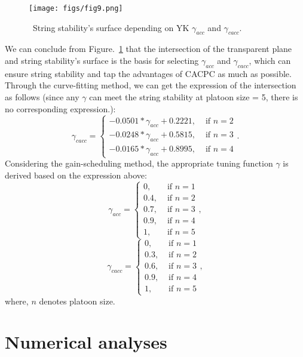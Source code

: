 \documentclass[a4paper,fleqn]{cas-sc}
\begin{document}
\begin{figure}
  \centering
  \texttt{[image: figs/fig9.png]}
  \caption{~String stability's surface depending on YK $\gamma_{acc}$ and $\gamma_{cacc}$.}
  \label{fig9}
\end{figure}
We can conclude from Figure.~\ref{fig9} that the intersection of the transparent plane and string stability's surface is the basis for selecting $\gamma_{acc}$ and $\gamma_{cacc}$, which can ensure string stability and tap the advantages of CACPC as much as possible. Through the curve-fitting method, we can get the expression of the intersection as follows (since any $\gamma$ can meet the string stability at platoon size = 5, there is no corresponding expression.):
\begin{equation}
  \gamma_{c a c c}= \begin{cases}-0.0501 * \gamma_{a c c}+0.2221 ,& \text { if } n=2 \\ -0.0248 * \gamma_{a c c}+0.5815 ,& \text { if } n=3 \\ -0.0165 * \gamma_{a c c}+0.8995 ,& \text { if } n=4\end{cases}.
\end{equation}
Considering the gain-scheduling method, the appropriate tuning function $\gamma$ is derived based on the expression above:
\begin{equation}
  \gamma_{a c c}=\left\{\begin{array}{cc}
    0 ,   & \text { if } n=1 \\
    0.4 , & \text { if } n=2 \\
    0.7 , & \text { if } n=3 \\
    0.9 , & \text { if } n=4 \\
    1 ,   & \text { if } n=5
  \end{array}\right.,
\end{equation}
\begin{equation}
  \gamma_{c a c c}=\left\{\begin{array}{cc}
    0 ,   & \text { if } n=1 \\
    0.3 , & \text { if } n=2 \\
    0.6 , & \text { if } n=3 \\
    0.9 , & \text { if } n=4 \\
    1 ,   & \text { if } n=5
  \end{array}\right.,
\end{equation}
where, $n$ denotes platoon size.

\section{Numerical analyses}
\label{Section 5}
\end{document}
